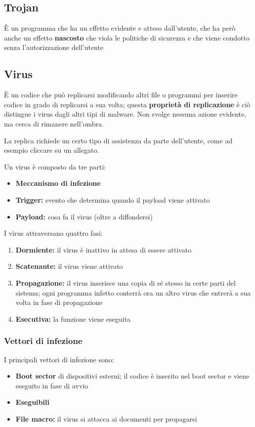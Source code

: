 \documentclass{report}
\begin{document}
\subsection{Trojan}
È un programma che ha un effetto evidente e atteso dall'utente, che ha però anche un 
effetto \textbf{nascosto} che viola le politiche di sicurezza e che viene condotto senza l'autorizzazione 
dell'utente

\subsection{Virus}
È un codice che può replicarsi modificando altri file o programmi per inserire codice in 
grado di replicarsi a sua volta; questa \textbf{proprietà di replicazione} è ciò distingue 
i virus dagli altri tipi di malware. Non svolge nessuna azione evidente, ma cerca di rimanere 
nell'ombra.

\noindent La replica richiede un certo tipo di assistenza da parte dell'utente, come ad esempio
cliccare su un allegato.

\noindent Un virus è composto da tre parti:
\begin{itemize}
    \item \textbf{Meccanismo di infezione}
    \item \textbf{Trigger:} evento che determina quando il payload viene attivato
    \item \textbf{Payload:} cosa fa il virus (oltre a diffondersi)
\end{itemize}

\noindent I virus attraversano quattro fasi:
\begin{enumerate}
    \item \textbf{Dormiente:} il virus è inattivo in attesa di essere attivato 
    \item \textbf{Scatenante:} il virus viene attivato 
    \item \textbf{Propagazione:} il virus inserisce una copia di sé stesso in certe parti del sistema; ogni programma 
    infetto conterrà ora un altro virus che entrerà a sua volta in fase di propagazione 
    \item \textbf{Esecutiva:} la funzione viene eseguita
\end{enumerate}

\subsubsection{Vettori di infezione}
I principali vettori di infezione sono:
\begin{itemize}
    \item \textbf{Boot sector} di dispositivi esterni; il codice è inserito nel boot sector e viene 
    eseguito in fase di avvio 
    \item \textbf{Eseguibili}
    \item \textbf{File macro:} il virus si attacca ai documenti per propagarsi 
\end{itemize}
\end{document}
